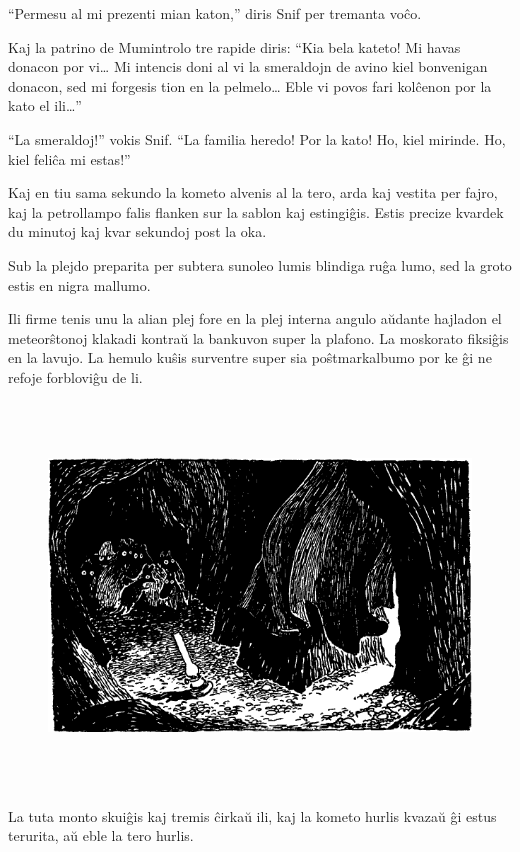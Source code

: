 ``Permesu al mi prezenti mian katon,'' diris Snif per tremanta voĉo.

Kaj la patrino de Mumintrolo tre rapide diris: ``Kia bela kateto! Mi havas donacon por vi{\ldots} Mi intencis doni al vi la smeraldojn de avino kiel bonvenigan donacon, sed mi forgesis tion en la pelmelo{\ldots} Eble vi povos fari kolĉenon por la kato el ili{\ldots}''

``La smeraldoj!'' vokis Snif. ``La familia heredo! Por la kato! Ho, kiel mirinde. Ho, kiel feliĉa mi estas!''

Kaj en tiu sama sekundo la kometo alvenis al la tero, arda kaj vestita per fajro, kaj la petrollampo falis flanken sur la sablon kaj estingiĝis. Estis precize kvardek du minutoj kaj kvar sekundoj post la oka.

Sub la plejdo preparita per subtera sunoleo lumis blindiga ruĝa lumo, sed la groto estis en nigra mallumo.

Ili firme tenis unu la alian plej fore en la plej interna angulo aŭdante hajladon el meteorŝtonoj klakadi kontraŭ la bankuvon super la plafono. La moskorato fiksiĝis en la lavujo. La hemulo kuŝis surventre super sia poŝtmarkalbumo por ke ĝi ne refoje forbloviĝu de li.

\begin{figure}[htbp]
\centering
\includegraphics[width=450pt,height=290pt]{9-11.png}
\caption{}
\label{9-11}
\end{figure}

La tuta monto skuiĝis kaj tremis ĉirkaŭ ili, kaj la kometo hurlis kvazaŭ ĝi estus terurita, aŭ eble la tero hurlis.

